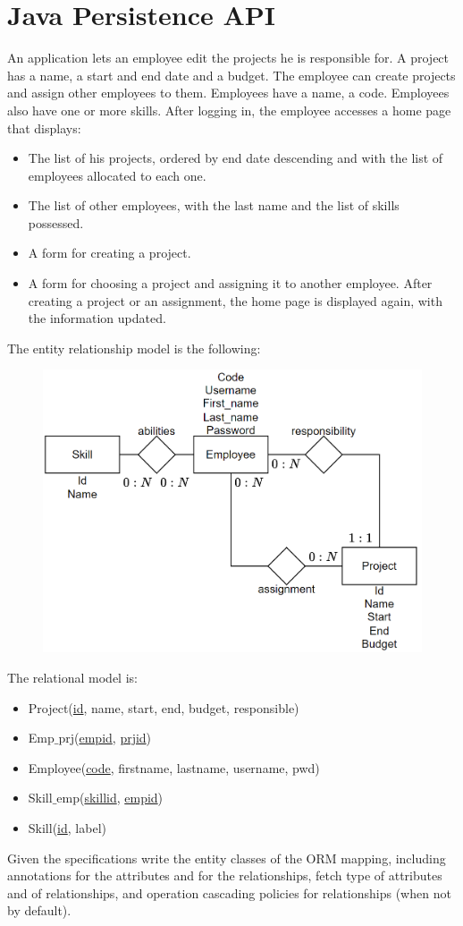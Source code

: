 \section{Java Persistence API}
An application lets an employee edit the projects he is responsible for. A project has a name, a start and end date and a budget. The employee can create 
projects and assign other employees to them. Employees have a name, a code. Employees also have one or more skills. After logging in, the employee accesses 
a home page that displays:
\begin{itemize}
    \item The list of his projects, ordered by end date descending and with the list of employees allocated to each one. 
    \item The list of other employees, with the last name and the list of skills possessed. 
    \item A form for creating a project. 
    \item A form for choosing a project and assigning it to another employee. After creating a project or an assignment, the home page is displayed again, 
        with the information updated. 
\end{itemize}
The entity relationship model is the following:
\begin{figure}[H]
    \centering
    \includegraphics[width=0.5\linewidth]{images/e-r.png}
\end{figure}
The relational model is: 
\begin{itemize}
    \item Project(\underline{id}, name, start, end, budget, responsible)
    \item Emp$\_$prj(\underline{empid}, \underline{prjid})
    \item Employee(\underline{code}, firstname, lastname, username, pwd)
    \item Skill$\_$emp(\underline{skillid}, \underline{empid})
    \item Skill(\underline{id}, label)
\end{itemize}
Given the specifications write the entity classes of the ORM mapping, including annotations for the attributes and for the relationships, fetch type of attributes
and of relationships, and operation cascading policies for relationships (when not by default). 

